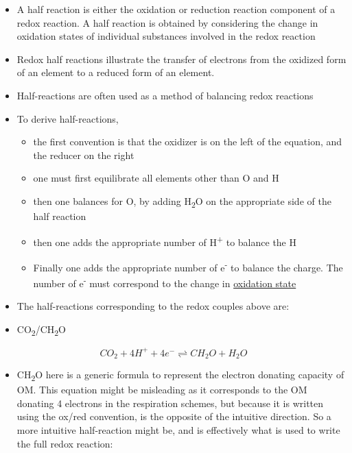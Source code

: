 \documentclass[]{book}
\providecommand{\tightlist}{%
  \setlength{\itemsep}{0pt}\setlength{\parskip}{0pt}}
\theoremstyle{definition}
\theoremstyle{definition}
\theoremstyle{definition}
\theoremstyle{remark}
\begin{document}
\begin{itemize}
\tightlist
\item
  A half reaction is either the oxidation or reduction reaction
  component of a redox reaction. A half reaction is obtained by
  considering the change in oxidation states of individual substances
  involved in the redox reaction \citep{Wikipedia_contributors2018-be}
\item
  Redox half reactions illustrate the transfer of electrons from the
  oxidized form of an element to a reduced form of an element.
\item
  Half-reactions are often used as a method of balancing redox reactions
\item
  To derive half-reactions,

  \begin{itemize}
  \tightlist
  \item
    the first convention is that the oxidizer is on the left of the
    equation, and the reducer on the right
  \item
    one must first equilibrate all elements other than O and H
  \item
    then one balances for O, by adding H\textsubscript{2}O on the
    appropriate side of the half reaction
  \item
    then one adds the appropriate number of H\textsuperscript{+} to
    balance the H
  \item
    Finally one adds the appropriate number of e\textsuperscript{-} to
    balance the charge. The number of e\textsuperscript{-} must
    correspond to the change in
    \protect\hyperlink{oxidation-state}{oxidation state}
  \end{itemize}
\item
  The half-reactions corresponding to the redox couples above are:
\item
  CO\textsubscript{2}/CH\textsubscript{2}O
\end{itemize}

\begin{equation}
CO_2 + 4 H^+ + 4 e^- \rightleftharpoons CH_2O + H_2O  
\end{equation}

\begin{itemize}
\tightlist
\item
  CH\textsubscript{2}O here is a generic formula to represent the
  electron donating capacity of OM. This equation might be misleading as
  it corresponds to the OM donating 4 electrons in the respiration
  schemes, but because it is written using the ox/red convention, is the
  opposite of the intuitive direction. So a more intuitive half-reaction
  might be, and is effectively what is used to write the full redox
  reaction:
\end{itemize}
\end{document}
